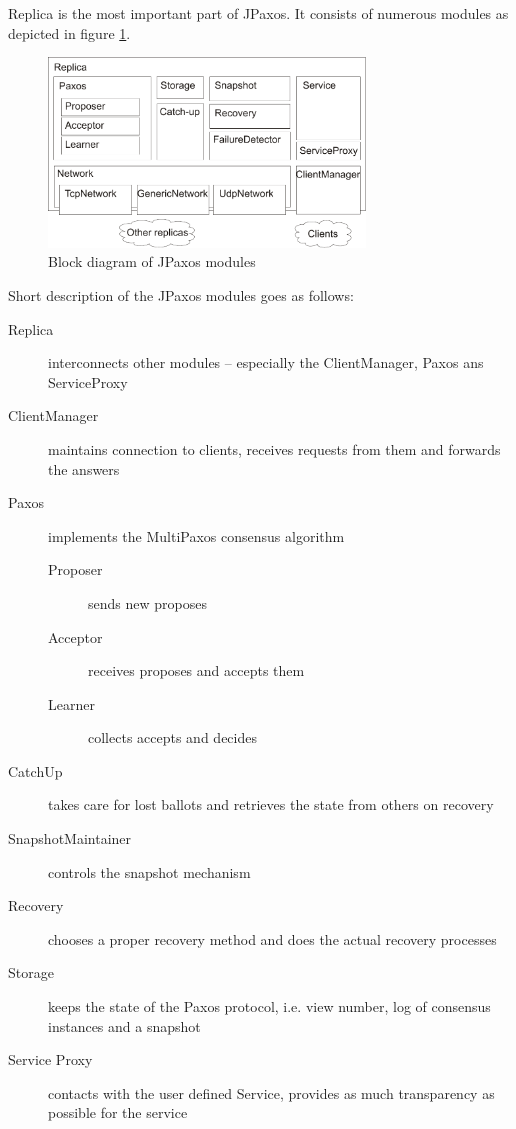 Replica is the most important part of JPaxos. It consists of numerous modules as depicted in figure \ref{fig:replica_architecture}.

\begin{figure}[h]
 \centering
 \includegraphics[keepaspectratio, width=0.75\textwidth]{architecture/replica_architecture.pdf}
 \caption{Block diagram of JPaxos modules}
 \label{fig:replica_architecture}
\end{figure}

Short description of the JPaxos modules goes as follows:

\begin{description}
  \item[Replica ] interconnects other modules -- especially the ClientManager, Paxos ans ServiceProxy
  \item[ClientManager ] maintains connection to clients, receives requests from them and forwards the answers
  \item[Paxos ] implements the MultiPaxos consensus algorithm
  \begin{description}
    \item[Proposer ] sends new proposes
    \item[Acceptor ] receives proposes and accepts them
    \item[Learner ] collects accepts and decides
  \end{description}
  \item[CatchUp ] takes care for lost ballots and retrieves the state from others on recovery
  \item[SnapshotMaintainer ] controls the snapshot mechanism
  \item[Recovery ] chooses a proper recovery method and does the actual recovery processes
  \item[Storage ] keeps the state of the Paxos protocol, i.e. view number, log of consensus instances and a snapshot
  \item[Service Proxy ] contacts with the user defined Service, provides as much trans\-pa\-rency as possible for the service
\end{description}

